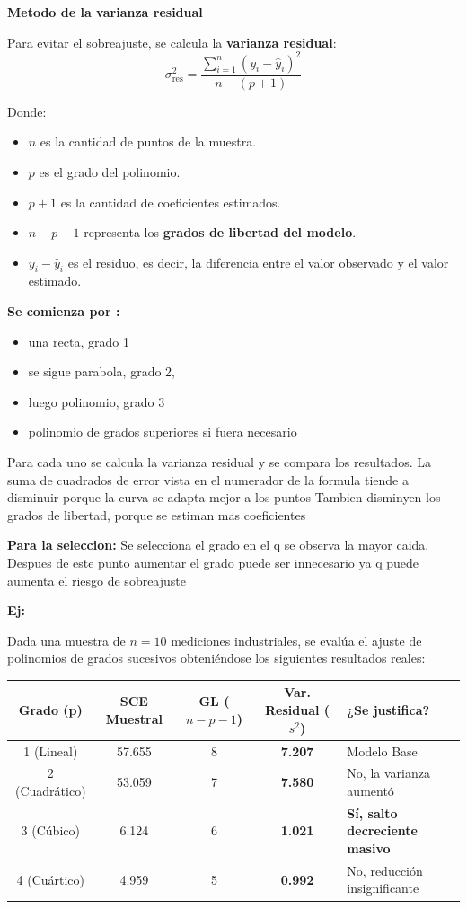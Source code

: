 \documentclass[10pt,a4paper]{article}
\begin{document}
\begin{center}
{\large\bfseries Metodo de la varianza residual}
\end{center}
\vspace{-2pt}

Para evitar el sobreajuste, se calcula la \textbf{varianza residual}:
\[
\sigma_{\text{res}}^2 = \frac{\displaystyle\sum_{i=1}^{n} (y_i-\hat{y}_i)^2}{n-(p+1)}
\]

Donde:
\begin{itemize}[leftmargin=16pt,itemsep=1pt,topsep=1pt,parsep=0pt]
  \item $n$ es la cantidad de puntos de la muestra.
  \item $p$ es el grado del polinomio.
  \item $p+1$ es la cantidad de coeficientes estimados.
  \item $n-p-1$ representa los \textbf{grados de libertad del modelo}.
  \item $y_i - \hat{y}_i$ es el residuo, es decir, la diferencia entre el valor observado y el valor estimado.
\end{itemize}

\textbf{Se comienza por :}
\begin{itemize}[leftmargin=16pt,itemsep=0pt,topsep=1pt,parsep=0pt]
  \item una recta, grado 1
  \item se sigue parabola, grado 2,
  \item luego polinomio, grado 3
  \item polinomio de grados superiores si fuera necesario
\end{itemize}
Para cada uno se calcula la varianza residual y se compara los resultados.
La suma de cuadrados de error vista en el numerador de la formula tiende a disminuir porque la curva se adapta mejor a los puntos
Tambien disminyen los grados de libertad, porque se estiman mas coeficientes

\textbf{Para la seleccion:}
Se selecciona el grado en el q se observa la mayor caida. Despues de este punto aumentar el grado puede ser innecesario ya q puede aumenta el riesgo de sobreajuste

\textbf{Ej:}

Dada una muestra de $n=10$ mediciones industriales, se evalúa el ajuste de polinomios de grados sucesivos obteniéndose los siguientes resultados reales:

\begin{center}
{\small
\begin{tabular}{c c c c p{3.6cm}}
\toprule
\textbf{Grado (p)} & \textbf{SCE Muestral} & \textbf{GL ($n-p-1$)} & \textbf{Var. Residual ($s^2$)} & \textbf{¿Se justifica?} \\
\midrule
1 (Lineal) & 57.655 & 8 & \textbf{7.207} & Modelo Base \\
2 (Cuadrático) & 53.059 & 7 & \textbf{7.580} & No, la varianza aumentó \\
3 (Cúbico) & 6.124 & 6 & \textbf{1.021} & \textbf{Sí, salto decreciente masivo} \\
4 (Cuártico) & 4.959 & 5 & \textbf{0.992} & No, reducción insignificante \\
\bottomrule
\end{tabular}
}
\end{center}
\end{document}

